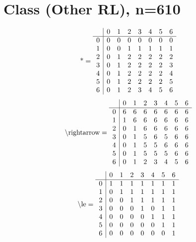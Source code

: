 \documentclass[11pt]{article}
\begin{document}
\section{Class (Other RL), n=610}
\[\text{*} = 
\begin{array}{r | r r r r r r r}
 & 0 & 1 & 2 & 3 & 4 & 5 & 6 \\ \hline
0 & 0 & 0 & 0 & 0 & 0 & 0 & 0 \\
1 & 0 & 0 & 1 & 1 & 1 & 1 & 1 \\
2 & 0 & 1 & 2 & 2 & 2 & 2 & 2 \\
3 & 0 & 1 & 2 & 2 & 2 & 2 & 3 \\
4 & 0 & 1 & 2 & 2 & 2 & 2 & 4 \\
5 & 0 & 1 & 2 & 2 & 2 & 2 & 5 \\
6 & 0 & 1 & 2 & 3 & 4 & 5 & 6 \\
\end{array}
\]
\[\text{\textbackslash rightarrow} = 
\begin{array}{r | r r r r r r r}
 & 0 & 1 & 2 & 3 & 4 & 5 & 6 \\ \hline
0 & 6 & 6 & 6 & 6 & 6 & 6 & 6 \\
1 & 1 & 6 & 6 & 6 & 6 & 6 & 6 \\
2 & 0 & 1 & 6 & 6 & 6 & 6 & 6 \\
3 & 0 & 1 & 5 & 6 & 5 & 6 & 6 \\
4 & 0 & 1 & 5 & 5 & 6 & 6 & 6 \\
5 & 0 & 1 & 5 & 5 & 5 & 6 & 6 \\
6 & 0 & 1 & 2 & 3 & 4 & 5 & 6 \\
\end{array}
\]
\[\text{\textbackslash le} = 
\begin{array}{r | r r r r r r r}
 & 0 & 1 & 2 & 3 & 4 & 5 & 6 \\ \hline
0 & 1 & 1 & 1 & 1 & 1 & 1 & 1 \\
1 & 0 & 1 & 1 & 1 & 1 & 1 & 1 \\
2 & 0 & 0 & 1 & 1 & 1 & 1 & 1 \\
3 & 0 & 0 & 0 & 1 & 0 & 1 & 1 \\
4 & 0 & 0 & 0 & 0 & 1 & 1 & 1 \\
5 & 0 & 0 & 0 & 0 & 0 & 1 & 1 \\
6 & 0 & 0 & 0 & 0 & 0 & 0 & 1 \\
\end{array}
\]
\end{document}
